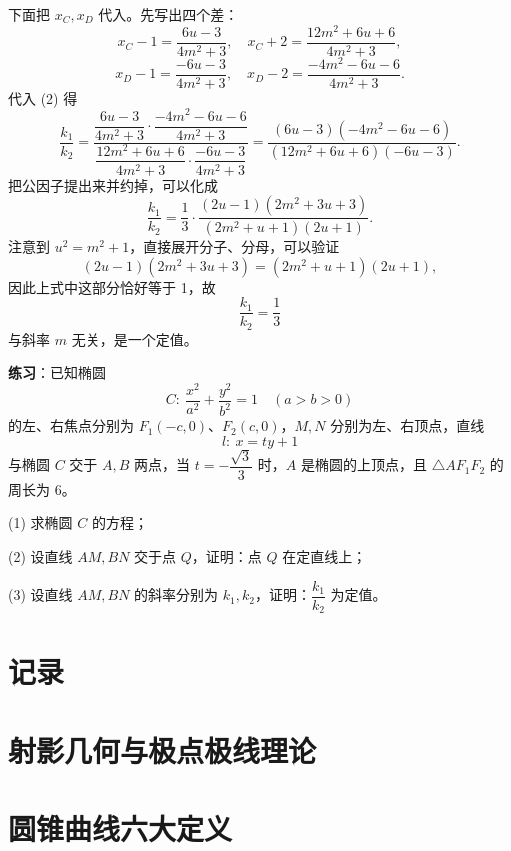 \documentclass{ctexart}
\begin{document}
   下面把 \(x_C, x_D\) 代入。先写出四个差：
   \[
   x_C - 1 = \frac{6u - 3}{4m^{2}+3}, \quad
   x_C + 2 = \frac{12m^{2} + 6u + 6}{4m^{2}+3},
   \]
   \[
   x_D - 1 = \frac{-6u - 3}{4m^{2}+3}, \quad
   x_D - 2 = \frac{-4m^{2} - 6u - 6}{4m^{2}+3}.
   \]
   代入 (2) 得
   \[
   \frac{k_1}{k_2}
   = \frac{\dfrac{6u - 3}{4m^{2}+3} \cdot \dfrac{-4m^{2} - 6u - 6}{4m^{2}+3}}
   {\dfrac{12m^{2} + 6u + 6}{4m^{2}+3} \cdot \dfrac{-6u - 3}{4m^{2}+3}}
   = \frac{(6u - 3)(-4m^{2} - 6u - 6)}{(12m^{2} + 6u + 6)(-6u - 3)}.
   \]
   把公因子提出来并约掉，可以化成
   \[
   \frac{k_1}{k_2} = \frac{1}{3} \cdot
   \frac{(2u - 1)(2m^{2} + 3u + 3)}{(2m^{2} + u + 1)(2u + 1)}.
   \]
   注意到 \(u^{2} = m^{2} + 1\)，直接展开分子、分母，可以验证
   \[
   (2u - 1)(2m^{2} + 3u + 3) = (2m^{2} + u + 1)(2u + 1),
   \]
   因此上式中这部分恰好等于 1，故
   \[
   \boxed{\frac{k_1}{k_2} = \frac{1}{3}}
   \]
   与斜率 \(m\) 无关，是一个定值。
   
   
   \medskip
   
   \textbf{练习}：已知椭圆
   \[
   C:\ \frac{x^{2}}{a^{2}}+\frac{y^{2}}{b^{2}}=1 \quad (a>b>0)
   \]
   的左、右焦点分别为 \(F_{1}(-c,0)\)、\(F_{2}(c,0)\)，\(M,N\) 分别为左、右顶点，直线
   \[
   l:\ x=ty+1
   \]
   与椭圆 \(C\) 交于 \(A,B\) 两点，当 \(t=-\dfrac{\sqrt{3}}{3}\) 时，\(A\) 是椭圆的上顶点，且 \(\triangle AF_{1}F_{2}\) 的周长为 \(6\)。
   
   (1) 求椭圆 \(C\) 的方程；
   
   (2) 设直线 \(AM, BN\) 交于点 \(Q\)，证明：点 \(Q\) 在定直线上；
   
   (3) 设直线 \(AM, BN\) 的斜率分别为 \(k_{1},k_{2}\)，证明：\(\dfrac{k_{1}}{k_{2}}\) 为定值。
   
   
   \section{记录}
   
   
	
	
	\section{射影几何与极点极线理论}

\section{圆锥曲线六大定义}

\subsection{}
\end{document}
